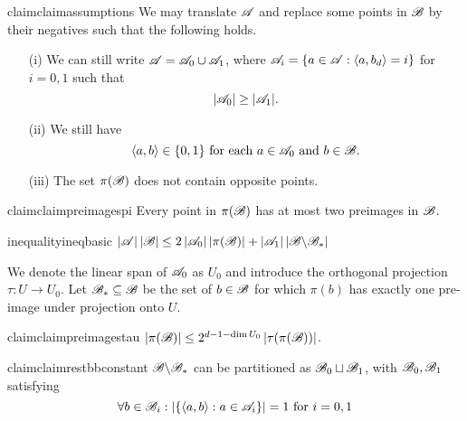 \begin{restatable}{claim}{claimassumptions}
    \label{cl1}
    We may translate ${\mathscr{A}}$ and replace some points in ${\mathscr{B}}$ by their negatives such that the following holds.
    \begin{itemize}
        \item[(i)] We can still write ${\mathscr{A}} = {\mathscr{A}}_0 \cup {\mathscr{A}}_1$, where ${\mathscr{A}}_i = \{ a \in {\mathscr{A}} : \langle a, b_d\rangle = i\}$ for $i=0,1$ such that
            \begin{equation} \label{eqa0gea1}
                |{\mathscr{A}}_0| \ge |{\mathscr{A}}_1|.
            \end{equation}
        \item[(ii)] We still have
            \begin{equation}
                \label{eqscala0}
                \langle a, b\rangle \in \{0,1\} \text{ for each } a \in {\mathscr{A}}_0 \text{ and } b \in {\mathscr{B}}.
            \end{equation}
        \item[(iii)] The set $\pi({\mathscr{B}})$ does not contain opposite points.
    \end{itemize}
\end{restatable}

\begin{restatable}{claim}{claimpreimagespi}\label{cl2}
   Every point in $\pi({\mathscr{B}})$ has at most two preimages in ${\mathscr{B}}$.
\end{restatable}

\begin{restatable}{inequality}{ineqbasic}\label{in0}
   $\left|{\mathscr{A}}\right|\left|{\mathscr{B}}\right| \leq 2\left|{\mathscr{A}}_0\right||\pi({\mathscr{B}})|+\left|{\mathscr{A}}_1\right|\left|{\mathscr{B}} \backslash {\mathscr{B}}_*\right|$
\end{restatable}

\noindent We denote the linear span of ${\mathscr{A}}_0$ as $U_0$ and introduce the orthogonal projection $\tau: U \rightarrow U_0$. Let ${\mathscr{B}}_* \subseteq {\mathscr{B}}$ be the set of $b \in {\mathscr{B}}$ for which $\pi(b)$ has exactly one pre-image under projection onto $U$.

\begin{restatable}{claim}{claimpreimagestau}\label{cl3}
    $\left|\pi({\mathscr{B}})\right| \leq 2^{d-1-\operatorname{dim} U_0}\left|\tau(\pi({\mathscr{B}}))\right|$.
\end{restatable}

\begin{restatable}{claim}{claimrestbbconstant}\label{cl4}
    ${\mathscr{B}} \backslash {\mathscr{B}}_* $ can be partitioned as $ {\mathscr{B}}_0 \sqcup {\mathscr{B}}_1$, with ${\mathscr{B}}_0, {\mathscr{B}}_1$ satisfying
    \[
        \forall b\in{\mathscr{B}}_i: \left|\left\{\langle a, b\rangle: a \in {\mathscr{A}}_i\right\}\right|=1\text{ for }i=0, 1
    \]
\end{restatable}

